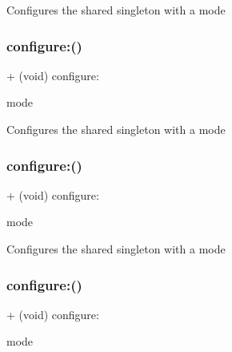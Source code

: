 Configures the shared singleton with a mode \mbox{\label{interfaceCDAudioManager_a4565c81bdaefd40cad943440c7a438ab}} 
\subsubsection{\texorpdfstring{configure\+:()}{configure:()}\hspace{0.1cm}{\footnotesize\ttfamily [2/4]}}
{\footnotesize\ttfamily + (void) configure\+: \begin{DoxyParamCaption}\item[{(t\+Audio\+Manager\+Mode)}]{mode }\end{DoxyParamCaption}}

Configures the shared singleton with a mode \mbox{\label{interfaceCDAudioManager_a4565c81bdaefd40cad943440c7a438ab}} 
\subsubsection{\texorpdfstring{configure\+:()}{configure:()}\hspace{0.1cm}{\footnotesize\ttfamily [3/4]}}
{\footnotesize\ttfamily + (void) configure\+: \begin{DoxyParamCaption}\item[{(t\+Audio\+Manager\+Mode)}]{mode }\end{DoxyParamCaption}}

Configures the shared singleton with a mode \mbox{\label{interfaceCDAudioManager_a4565c81bdaefd40cad943440c7a438ab}} 
\subsubsection{\texorpdfstring{configure\+:()}{configure:()}\hspace{0.1cm}{\footnotesize\ttfamily [4/4]}}
{\footnotesize\ttfamily + (void) configure\+: \begin{DoxyParamCaption}\item[{(t\+Audio\+Manager\+Mode)}]{mode }\end{DoxyParamCaption}}

